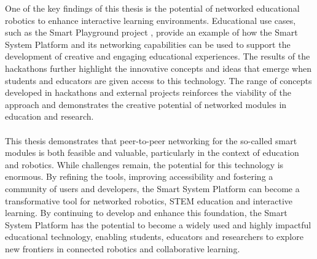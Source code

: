 One of the key findings of this thesis is the potential of networked educational robotics to enhance interactive learning environments. Educational use cases, such as the Smart Playground project \citep{jess_smart_2025}, provide an example of how the Smart System Platform and its networking capabilities can be used to support the development of creative and engaging educational experiences. The results of the hackathons further highlight the innovative concepts and ideas that emerge when students and educators are given access to this technology. The range of concepts developed in hackathons and external projects reinforces the viability of the approach and demonstrates the creative potential of networked modules in education and research. \\\\

This thesis demonstrates that peer-to-peer networking for the so-called smart modules is both feasible and valuable, particularly in the context of education and robotics. While challenges remain, the potential for this technology is enormous. By refining the tools, improving accessibility and fostering a community of users and developers, the Smart System Platform can become a transformative tool for networked robotics, STEM education and interactive learning.
By continuing to develop and enhance this foundation, the Smart System Platform has the potential to become a widely used and highly impactful educational technology, enabling students, educators and researchers to explore new frontiers in connected robotics and collaborative learning.






